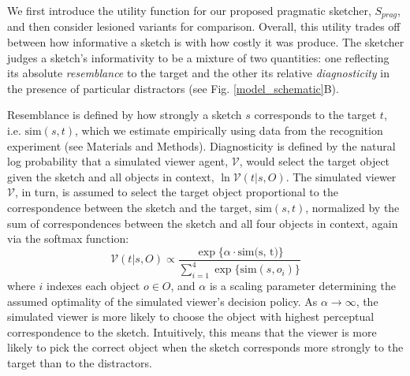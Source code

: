 \documentclass[9pt,twocolumn,twoside]{pnas-new}
\begin{document}
We first introduce the utility function for our proposed pragmatic sketcher, $S_{prag}$, and then consider lesioned variants for comparison. 
Overall, this utility trades off between how informative a sketch is with how costly it was produce.
The sketcher judges a sketch's informativity to be a mixture of two quantities: one reflecting its absolute \textit{resemblance} to the target and the other its relative \textit{diagnosticity} in the presence of particular distractors (see Fig. \ref{model_schematic}B).  

Resemblance is defined by how strongly a sketch $s$ corresponds to the target $t$, i.e. $\textrm{sim}(s,t)$, which we estimate empirically using data from the recognition experiment (see Materials and Methods).
Diagnosticity is defined by the natural log probability that a simulated viewer agent, $\mathcal{V}$, would select the target object given the sketch and all objects in context, $\ln \mathcal{V}(t|s,O)$. 
The simulated viewer $\mathcal{V}$, in turn, is assumed to select the target object proportional to the correspondence between the sketch and the target, $\textrm{sim}(s,t)$, normalized by the sum of correspondences between the sketch and all four objects in context, again via the softmax function:
\begin{equation} \label{literal_viewer_score}
\mathcal{V}(t|s,O) \propto \frac {\exp\{\alpha \cdot \textrm{sim(s, t)}\}} {\sum_{i=1}^{4} \exp\{\textrm{sim}(s,o_i)\}}
\end{equation}
where $i$ indexes each object $o\in O$, and $\alpha$ is a scaling parameter determining the assumed optimality of the simulated viewer's decision policy. 
As $\alpha \rightarrow \infty$, the simulated viewer is more likely to choose the object with highest perceptual correspondence to the sketch. 
Intuitively, this means that the viewer is more likely to pick the correct object when the sketch corresponds more strongly to the target than to the distractors. 
\end{document}
